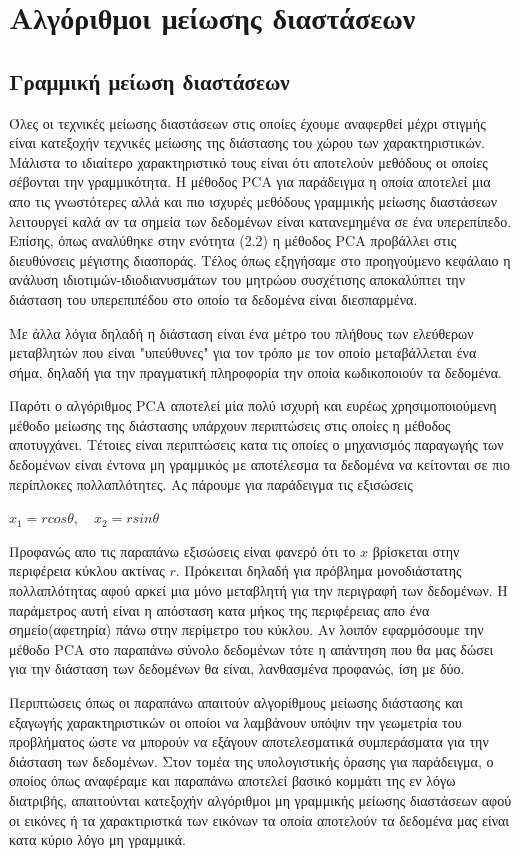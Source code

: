 
\chapter{Αλγόριθμοι μείωσης διαστάσεων}

\section{Γραμμική μείωση διαστάσεων}
\par
Όλες οι τεχνικές μείωσης διαστάσεων στις οποίες έχουμε αναφερθεί μέχρι στιγμής είναι κατεξοχήν τεχνικές μείωσης της διάστασης του χώρου των χαρακτηριστικών. Μάλιστα το ιδιαίτερο χαρακτηριστικό τους είναι ότι αποτελούν μεθόδους οι οποίες σέβονται την γραμμικότητα. Η μέθοδος \textlatin{PCA} για παράδειγμα η οποία αποτελεί μια απο τις γνωστότερες αλλά και πιο ισχυρές μεθόδους γραμμικής μείωσης διαστάσεων λειτουργεί καλά αν τα σημεία των δεδομένων είναι κατανεμημένα σε ένα υπερεπίπεδο. Επίσης, όπως αναλύθηκε στην ενότητα (2.2) η μέθοδος \textlatin{PCA} προβάλλει στις διευθύνσεις μέγιστης διασποράς. Τέλος όπως εξηγήσαμε στο προηγούμενο κεφάλαιο η ανάλυση ιδιοτιμών-ιδιοδιανυσμάτων του μητρώου συσχέτισης αποκαλύπτει την διάσταση του υπερεπιπέδου στο οποίο τα δεδομένα είναι διεσπαρμένα. 
\par
Με άλλα λόγια δηλαδή η διάσταση είναι ένα μέτρο του πλήθους των ελεύθερων μεταβλητών που είναι "υπεύθυνες" για τον τρόπο με τον οποίο μεταβάλλεται ένα σήμα, δηλαδή για την πραγματική πληροφορία την οποία κωδικοποιούν τα δεδομένα. 
\par
Παρότι ο αλγόριθμος \textlatin{PCA} αποτελεί μία πολύ ισχυρή και ευρέως χρησιμοποιούμενη μέθοδο μείωσης της διάστασης υπάρχουν περιπτώσεις στις οποίες η μέθοδος αποτυγχάνει. Τέτοιες είναι περιπτώσεις κατα τις οποίες ο μηχανισμός παραγωγής των δεδομένων είναι έντονα μη γραμμικός με αποτέλεσμα τα δεδομένα να κείτονται σε πιο περίπλοκες πολλαπλότητες. Ας πάρουμε για παράδειγμα τις εξισώσεις \\
\begin{center}
$x_{1}=r cos\theta, \quad x_{2}=rsin\theta$
\end{center}
Προφανώς απο τις παραπάνω εξισώσεις είναι φανερό ότι το $x$ βρίσκεται στην περιφέρεια κύκλου ακτίνας $r$. Πρόκειται δηλαδή για πρόβλημα μονοδιάστατης πολλαπλότητας αφού αρκεί μια μόνο μεταβλητή για την περιγραφή των δεδομένων. Η παράμετρος αυτή είναι η απόσταση κατα μήκος της περιφέρειας απο ένα σημείο(αφετηρία) πάνω στην περίμετρο του κύκλου. Αν λοιπόν εφαρμόσουμε την μέθοδο \textlatin{PCA} στο παραπάνω σύνολο δεδομένων τότε η απάντηση που θα μας δώσει για την διάσταση των δεδομένων θα είναι, λανθασμένα προφανώς, ίση με δύο. 
\par
Περιπτώσεις όπως οι παραπάνω απαιτούν αλγορίθμους μείωσης διάστασης και εξαγωγής χαρακτηριστικών οι οποίοι να λαμβάνουν υπόψιν την γεωμετρία του προβλήματος ώστε να μπορούν να εξάγουν αποτελεσματικά συμπεράσματα για την διάσταση των δεδομένων. Στον τομέα της υπολογιστικής όρασης για παράδειγμα, ο οποίος όπως αναφέραμε και παραπάνω αποτελεί βασικό κομμάτι της εν λόγω διατριβής, απαιτούνται κατεξοχήν αλγόριθμοι μη γραμμικής μείωσης διαστάσεων αφού οι εικόνες ή τα χαρακτιριστκά των εικόνων τα οποία αποτελούν τα δεδομένα μας είναι κατα κύριο λόγο μη γραμμικά. 

